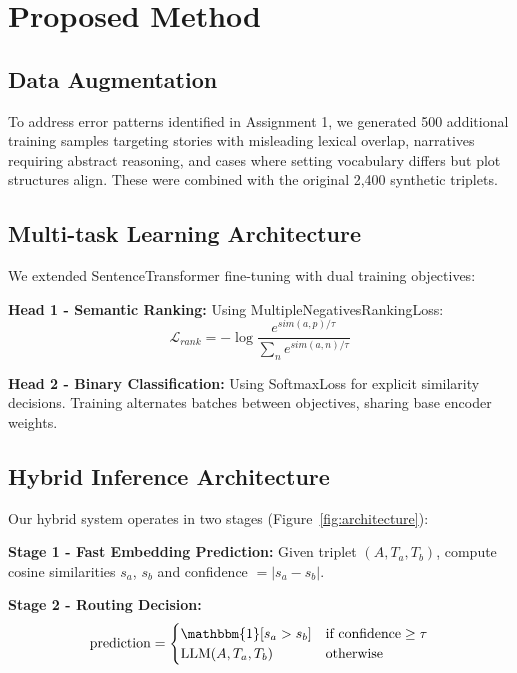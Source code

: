\documentclass[conference]{IEEEtran}
\begin{document}
\section{Proposed Method}

\subsection{Data Augmentation}

To address error patterns identified in Assignment 1, we generated 500 additional training samples targeting stories with misleading lexical overlap, narratives requiring abstract reasoning, and cases where setting vocabulary differs but plot structures align. These were combined with the original 2,400 synthetic triplets.

\subsection{Multi-task Learning Architecture}

We extended SentenceTransformer fine-tuning with dual training objectives:

\textbf{Head 1 - Semantic Ranking:} Using MultipleNegativesRankingLoss:
\begin{equation}
\mathcal{L}_{rank} = -\log \frac{e^{sim(a, p)/\tau}}{\sum_{n} e^{sim(a, n)/\tau}}
\end{equation}

\textbf{Head 2 - Binary Classification:} Using SoftmaxLoss for explicit similarity decisions. Training alternates batches between objectives, sharing base encoder weights.

\subsection{Hybrid Inference Architecture}

Our hybrid system operates in two stages (Figure~\ref{fig:architecture}):

\textbf{Stage 1 - Fast Embedding Prediction:}
Given triplet $(A, T_a, T_b)$, compute cosine similarities $s_a$, $s_b$ and confidence $= |s_a - s_b|$.

\textbf{Stage 2 - Routing Decision:}
\begin{equation}
\text{prediction} = 
\begin{cases}
\mathbbm{1}[s_a > s_b] & \text{if confidence} \geq \tau \\
\text{LLM}(A, T_a, T_b) & \text{otherwise}
\end{cases}
\end{equation}
\end{document}
